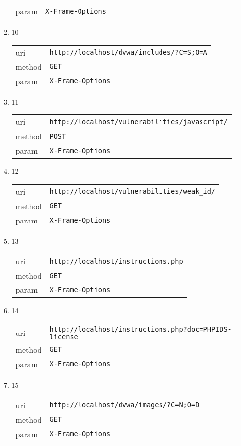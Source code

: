 \documentclass[10pt]{article}
\begin{document}
\begin{itemize}
\begin{enumerate}
\begin{tabular}{| l | p{12cm}}
param & \texttt{X-Frame-Options} \\
\end{tabular}
\item[] 10
\begin{tabular}{| l | p{12cm}}
uri & \texttt{http://localhost/dvwa/includes/?C=S;O=A} \\
method & \texttt{GET} \\
param & \texttt{X-Frame-Options} \\
\end{tabular}
\item[] 11
\begin{tabular}{| l | p{12cm}}
uri & \texttt{http://localhost/vulnerabilities/javascript/} \\
method & \texttt{POST} \\
param & \texttt{X-Frame-Options} \\
\end{tabular}
\item[] 12
\begin{tabular}{| l | p{12cm}}
uri & \texttt{http://localhost/vulnerabilities/weak\_id/} \\
method & \texttt{GET} \\
param & \texttt{X-Frame-Options} \\
\end{tabular}
\item[] 13
\begin{tabular}{| l | p{12cm}}
uri & \texttt{http://localhost/instructions.php} \\
method & \texttt{GET} \\
param & \texttt{X-Frame-Options} \\
\end{tabular}
\item[] 14
\begin{tabular}{| l | p{12cm}}
uri & \texttt{http://localhost/instructions.php?doc=PHPIDS-license} \\
method & \texttt{GET} \\
param & \texttt{X-Frame-Options} \\
\end{tabular}
\item[] 15
\begin{tabular}{| l | p{12cm}}
uri & \texttt{http://localhost/dvwa/images/?C=N;O=D} \\
method & \texttt{GET} \\
param & \texttt{X-Frame-Options} \\
\end{tabular}

\end{enumerate}
\end{itemize}
\end{document}
